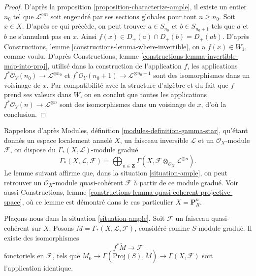 \begin{proof}
D'après la proposition \ref{proposition-characterize-ample}, il existe un entier
$n_0$ tel que $\mathcal{L}^{\otimes n}$ soit engendré par ses sections globales pour tout
$n \geq n_0$. Soit $x \in X$. D'après ce qui précède, on peut trouver
$a \in S_{n_0}$ et $b \in S_{n_0 + 1}$ tels que
$a$ et $b$ ne s'annulent pas en $x$. Ainsi
$f(x) \in D_{+}(a) \cap D_{+}(b) = D_{+}(ab)$. D'après
Constructions, lemme \ref{constructions-lemma-where-invertible},
on a $f(x) \in W_1$, comme voulu. D'après
Constructions, lemme \ref{constructions-lemma-invertible-map-into-proj},
utilisé dans la construction de l'application $f$,
les applications
$f^*\mathcal{O}_Y(n_0) \to \mathcal{L}^{\otimes n_0}$ et
$f^*\mathcal{O}_Y(n_0 + 1) \to \mathcal{L}^{\otimes n_0 + 1}$
sont des isomorphismes dans un voisinage de $x$. Par compatibilité avec
la structure d'algèbre et du fait que $f$ prend ses valeurs dans $W$,
on en conclut que toutes les applications
$f^*\mathcal{O}_Y(n) \to \mathcal{L}^{\otimes n}$ sont des isomorphismes
dans un voisinage de $x$, d'où la conclusion.
\end{proof}

\noindent
Rappelons d'après Modules, définition \ref{modules-definition-gamma-star},
qu'étant donnés un espace localement annelé $X$, un faisceau inversible $\mathcal{L}$
et un $\mathcal{O}_X$-module $\mathcal{F}$, on dispose du
$\Gamma_*(X, \mathcal{L})$-module gradué
$$
\Gamma_*(X, \mathcal{L}, \mathcal{F}) =
\bigoplus\nolimits_{n \in \mathbf{Z}}
\Gamma(X, \mathcal{F} \otimes_{\mathcal{O}_X} \mathcal{L}^{\otimes n}).
$$
Le lemme suivant affirme que, dans la situation \ref{situation-ample},
on peut retrouver un $\mathcal{O}_X$-module quasi-cohérent $\mathcal{F}$
à partir de ce module gradué. Voir aussi
Constructions, lemme \ref{constructions-lemma-quasi-coherent-projective-space},
où ce lemme est démontré dans le cas particulier $X = \mathbf{P}^n_R$.

\begin{lemma}
\label{lemma-ample-quasi-coherent}
Plaçons-nous dans la situation \ref{situation-ample}.
Soit $\mathcal{F}$ un faisceau quasi-cohérent sur $X$.
Posons $M = \Gamma_*(X, \mathcal{L}, \mathcal{F})$, considéré comme $S$-module gradué.
Il existe des isomorphismes
$$
f^*\widetilde{M} \longrightarrow \mathcal{F}
$$
fonctoriels en $\mathcal{F}$, tels que
$M_0 \to \Gamma(\text{Proj}(S), \widetilde{M}) \to \Gamma(X, \mathcal{F})$
soit l'application identique.
\end{lemma}

